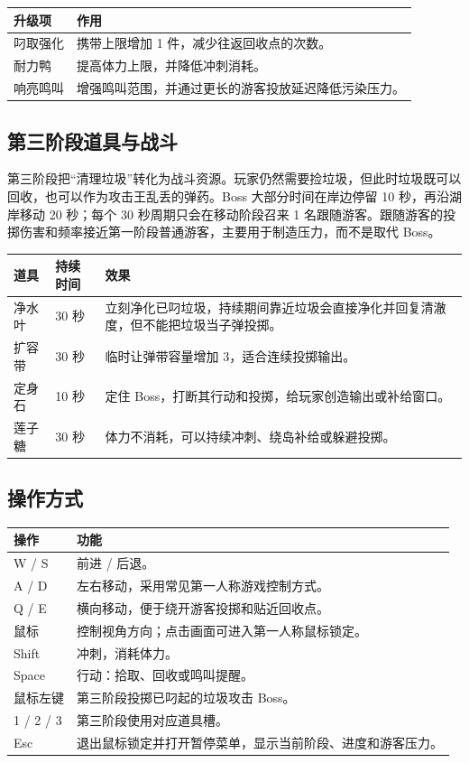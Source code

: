 \documentclass[UTF8,a4paper,12pt]{ctexart}
\begin{document}
\begin{table}[h]
\centering
\begin{tabularx}{\textwidth}{p{3cm}Y}
\toprule
升级项 & 作用 \\
\midrule
叼取强化 & 携带上限增加 1 件，减少往返回收点的次数。 \\
耐力鸭 & 提高体力上限，并降低冲刺消耗。 \\
响亮鸣叫 & 增强鸣叫范围，并通过更长的游客投放延迟降低污染压力。 \\
\bottomrule
\end{tabularx}
\end{table}

\subsection{第三阶段道具与战斗}

第三阶段把``清理垃圾''转化为战斗资源。玩家仍然需要捡垃圾，但此时垃圾既可以回收，也可以作为攻击王乱丢的弹药。Boss 大部分时间在岸边停留 10 秒，再沿湖岸移动 20 秒；每个 30 秒周期只会在移动阶段召来 1 名跟随游客。跟随游客的投掷伤害和频率接近第一阶段普通游客，主要用于制造压力，而不是取代 Boss。

\begin{longtable}{p{2.6cm}p{3cm}p{8.2cm}}
\toprule
道具 & 持续时间 & 效果 \\
\midrule
\endhead
净水叶 & 30 秒 & 立刻净化已叼垃圾，持续期间靠近垃圾会直接净化并回复清澈度，但不能把垃圾当子弹投掷。 \\
扩容带 & 30 秒 & 临时让弹带容量增加 3，适合连续投掷输出。 \\
定身石 & 10 秒 & 定住 Boss，打断其行动和投掷，给玩家创造输出或补给窗口。 \\
莲子糖 & 30 秒 & 体力不消耗，可以持续冲刺、绕岛补给或躲避投掷。 \\
\bottomrule
\end{longtable}

\subsection{操作方式}

\begin{table}[h]
\centering
\begin{tabularx}{\textwidth}{p{3cm}Y}
\toprule
操作 & 功能 \\
\midrule
W / S & 前进 / 后退。 \\
A / D & 左右移动，采用常见第一人称游戏控制方式。 \\
Q / E & 横向移动，便于绕开游客投掷和贴近回收点。 \\
鼠标 & 控制视角方向；点击画面可进入第一人称鼠标锁定。 \\
Shift & 冲刺，消耗体力。 \\
Space & 行动：拾取、回收或鸣叫提醒。 \\
鼠标左键 & 第三阶段投掷已叼起的垃圾攻击 Boss。 \\
1 / 2 / 3 & 第三阶段使用对应道具槽。 \\
Esc & 退出鼠标锁定并打开暂停菜单，显示当前阶段、进度和游客压力。 \\
\bottomrule
\end{tabularx}
\end{table}
\end{document}
